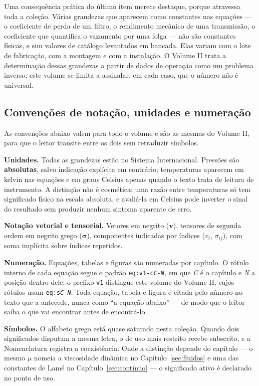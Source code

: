 \documentclass[12pt,a4paper]{article}
\numberwithin{equation}{section}
\numberwithin{table}{section}
\numberwithin{figure}{section}
\begin{document}
Uma consequência prática do último item merece destaque, porque atravessa toda
a coleção. Várias grandezas que aparecem como constantes nas equações --- o
coeficiente de perda de um filtro, o rendimento mecânico de uma transmissão, o
coeficiente que quantifica o vazamento por uma folga --- não são constantes
físicas, e sim valores de catálogo levantados em bancada. Elas variam com o
lote de fabricação, com a montagem e com a instalação. O Volume II trata a
determinação dessas grandezas a partir de dados de operação como um problema
inverso; este volume se limita a assinalar, em cada caso, que o número não é
universal.

\subsection{Convenções de notação, unidades e numeração}

As convenções abaixo valem para todo o volume e são as mesmas do Volume II,
para que o leitor transite entre os dois sem retraduzir símbolos.

\textbf{Unidades.} Todas as grandezas estão no Sistema Internacional. Pressões
são \textbf{absolutas}, salvo indicação explícita em contrário; temperaturas
aparecem em kelvin nas equações e em graus Celsius apenas quando o texto trata
de leitura de instrumento. A distinção não é cosmética: uma razão entre
temperaturas só tem significado físico na escala absoluta, e avaliá-la em
Celsius pode inverter o sinal do resultado sem produzir nenhum sintoma
aparente de erro.

\textbf{Notação vetorial e tensorial.} Vetores em negrito ($\mathbf{v}$),
tensores de segunda ordem em negrito grego ($\boldsymbol{\sigma}$),
componentes indicadas por índices ($v_i$, $\sigma_{ij}$), com soma implícita
sobre índices repetidos.

\textbf{Numeração.} Equações, tabelas e figuras são numeradas por capítulo. O
rótulo interno de cada equação segue o padrão
\texttt{eq:v1-c\textit{C}-\textit{N}}, em que \textit{C} é o capítulo e
\textit{N} a posição dentro dele; o prefixo \texttt{v1} distingue este volume
do Volume II, cujos rótulos usam \texttt{eq:s\textit{C}-\textit{N}}. Toda
equação, tabela e figura é citada pelo número no texto que a antecede, nunca
como ``a equação abaixo'' --- de modo que o leitor saiba o que vai encontrar
antes de encontrá-lo.

\textbf{Símbolos.} O alfabeto grego está quase saturado nesta coleção. Quando
dois significados disputam a mesma letra, o de uso mais restrito recebe
subscrito, e a Nomenclatura registra a coexistência. Onde a distinção depende
do capítulo --- o mesmo $\mu$ nomeia a viscosidade dinâmica no
Capítulo~\ref{sec:fluidos} e uma das constantes de Lamé no
Capítulo~\ref{sec:continuo} --- o significado ativo é declarado no ponto de
uso.
\end{document}
